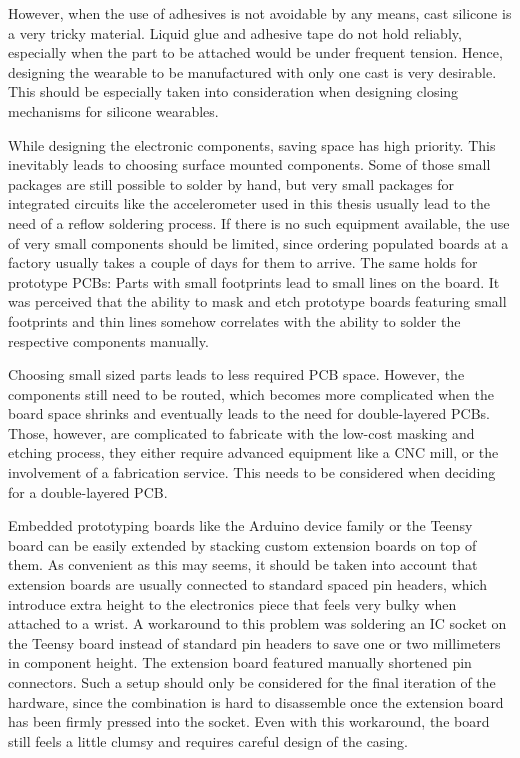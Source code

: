 However, when the use of adhesives is not avoidable by any means, cast silicone is a very tricky material. Liquid glue and adhesive tape do not hold reliably, especially when the part to be attached would be under frequent tension. Hence, designing the wearable to be manufactured with only one cast is very desirable. This should be especially taken into consideration when designing closing mechanisms for silicone wearables.

While designing the electronic components, saving space has high priority. This inevitably leads to choosing surface mounted components. Some of those small packages are still possible to solder by hand, but very small packages for integrated circuits like the accelerometer used in this thesis usually lead to the need of a reflow soldering process. If there is no such equipment available, the use of very small components should be limited, since ordering populated boards at a factory usually takes a couple of days for them to arrive. The same holds for prototype \ac{PCB}s: Parts with small footprints lead to small lines on the board. It was perceived that the ability to mask and etch prototype boards featuring small footprints and thin lines somehow correlates with the ability to solder the respective components manually.

Choosing small sized parts leads to less required \ac{PCB} space. However, the components still need to be routed, which becomes more complicated when the board space shrinks and eventually leads to the need for double-layered \ac{PCB}s. Those, however, are complicated to fabricate with the low-cost masking and etching process, they either require advanced equipment like a CNC mill, or the involvement of a fabrication service. This needs to be considered when deciding for a double-layered \ac{PCB}.

Embedded prototyping boards like the Arduino device family or the Teensy board can be easily extended by stacking custom extension boards on top of them. As convenient as this may seems, it should be taken into account that extension boards are usually connected to standard spaced pin headers, which introduce extra height to the electronics piece that feels very bulky when attached to a wrist. A workaround to this problem was soldering an IC socket on the Teensy board instead of standard pin headers to save one or two millimeters in component height. The extension board featured manually shortened pin connectors. Such a setup should only be considered for the final iteration of the hardware, since the combination is hard to disassemble once the extension board has been firmly pressed into the socket. Even with this workaround, the board still feels a little clumsy and requires careful design of the casing.

